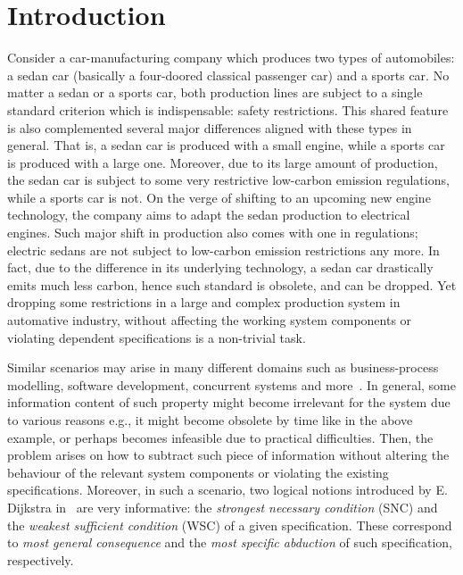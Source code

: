 \documentclass[letterpaper]{article} %
\begin{document}
\section{Introduction}
Consider a car-manufacturing company which produces two types of automobiles: a sedan car (basically a four-doored classical passenger car) and a sports car.  No matter a sedan or a sports car, both production lines are subject to a single standard criterion which is indispensable: safety restrictions.  This shared feature is also complemented several major differences aligned with these types in general. That is, a sedan car is produced with a small engine, while a sports car is produced with a large one. Moreover, due to its large amount of production, the sedan car is subject to some very restrictive low-carbon emission regulations, while a sports car is not. On the verge of shifting to an upcoming new engine technology, the company aims to adapt the sedan production to electrical engines. Such major shift in production also comes with one in regulations; electric sedans are not subject to low-carbon emission restrictions any more. In fact, due to the difference in its underlying technology, a sedan car drastically emits much less carbon, hence such standard is obsolete, and can be dropped. Yet dropping some restrictions in a large and complex production system in automative industry, without affecting the working system components or violating dependent specifications  is a non-trivial task.


Similar scenarios may arise in many different domains such as business-process modelling, software development, concurrent systems and more~\cite{Baier:PMC:2008}.  In general,  some information content of such property might become irrelevant for the system due to various reasons e.g., it might become obsolete by time like in the above example, or perhaps  becomes infeasible due to practical difficulties. Then, the problem arises on how to subtract such piece of information without altering the behaviour of the relevant system components or violating the existing specifications. Moreover, in such a scenario, two logical notions introduced by E. Dijkstra in~\cite{dijkstra1978guarded} are very informative: the \emph{strongest necessary condition} (SNC) and the \emph{weakest sufficient condition}  (WSC)  of a given specification. These correspond to \emph{most general consequence} and the \emph{most specific abduction} of such specification, respectively.

\end{document}
